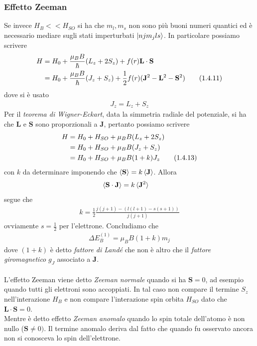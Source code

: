 \documentclass{article}
\begin{document}
\subsubsection*{Effetto Zeeman}
Se invece $H_B << H_{SO}$ si ha che $m_l, m_s$ non sono più buoni numeri quantici ed è necessario mediare sugli stati imperturbati $\ket{njm_jls}$. In particolare possiamo scrivere
\begin{align}
    H &= H_0 + \frac{\mu_B B}{\hbar}(L_z + 2S_z) + f(r)\mathbf{L} \cdot \mathbf{S} \notag \\
    &= H_0 + \frac{\mu_B B}{\hbar}(J_z + S_z) + \frac{1}{2}f(r)(\mathbf{J}^2 - \mathbf{L}^2 - \mathbf{S}^2) \tag{1.4.11}
\end{align}
dove si è usato 
\begin{align}
    J_z = L_z + S_z \tag{1.4.12}
\end{align}
Per il \textit{teorema di Wigner-Eckart}, data la simmetria radiale del potenziale, si ha che $\mathbf{L}$ e $\mathbf{S}$ sono proporzionali a $\mathbf{J}$, pertanto possiamo scrivere 
\begin{align}
    H &= H_0 + H_{SO} + \mu_BB(L_z + 2S_z) \notag \\
    &= H_0 + H_{SO} + \mu_BB(J_z + S_z) \notag \\
    &= H_0 + H_{SO} + \mu_BB(1 + k)J_z \tag{1.4.13}
\end{align}
con $k$ da determinare imponendo che $\braket{\mathbf{S}} = k\braket{\mathbf{J}}$. Allora 
\begin{align}
    \braket{\mathbf{S} \cdot \mathbf{J}} &= k\braket{\mathbf{J}^2} \notag
\end{align}
segue che 
\begin{align}
    k = \frac{1}{2}\frac{j(j + 1) - (l(l + 1) - s(s + 1))}{j(j + 1)} \tag{1.4.14}
\end{align}
ovviamente $s = \frac{1}{2}$ per l'elettrone. Concludiamo che 
\begin{align}
    \Delta E^{(1)}_{B} = \mu_BB(1 + k)m_j \tag{1.4.15}
\end{align}
dove $(1 + k)$ è detto \textit{fattore di Landé}
 che non è altro che il \textit{fattore giromagnetico} $g_J$ associato a $\mathbf{J}$. \\ \\
L'effetto Zeeman viene detto \textit{Zeeman normale} quando si ha $\mathbf{S} = 0$, ad esempio quando tutti gli elettroni sono accoppiati. In tal caso non compare il termine $S_z$ nell'interazione $H_B$ e non compare l'interazione spin orbita $H_{SO}$ dato che $\mathbf{L} \cdot \mathbf{S} = 0$. \\
Mentre è detto effetto \textit{Zeeman anomalo} quando lo spin totale dell'atomo è non nullo ($\mathbf{S} \neq 0)$. Il termine anomalo deriva dal fatto che quando fu osservato ancora non si conosceva lo spin dell'elettrone.
\end{document}
